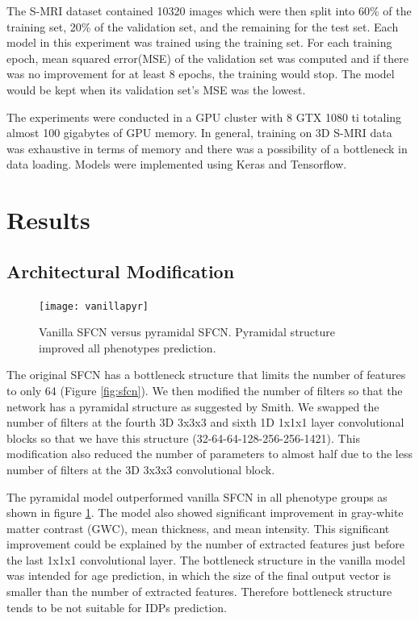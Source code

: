 \documentclass{article}
\begin{document}
    The S-MRI dataset contained 10320 images which were then split into 60\% of the training set, 20\% of the validation set, and the remaining for the test set. 
    Each model in this experiment was trained using the training set. 
    For each training epoch, mean squared error(MSE) of the validation set was computed and if there was no improvement for at least 8 epochs, the training would stop. 
    The model would be kept when its validation set’s MSE was the lowest.

    The experiments were conducted in a GPU cluster with 8 GTX 1080 ti totaling almost 100 gigabytes of GPU memory. 
    In general, training on 3D S-MRI data was exhaustive in terms of memory and there was a possibility of a bottleneck in data loading. 
    Models were implemented using Keras and Tensorflow.
    \section*{Results}
    
    \subsection*{Architectural Modification}
    \begin{figure}[h]
        \centering
        \texttt{[image: vanillapyr]}
        \centering
        \caption{
            Vanilla SFCN versus pyramidal SFCN. 
            Pyramidal structure improved all phenotypes prediction.}
        \label{fig:vanillapyr}
    \end{figure}
    The original SFCN has a bottleneck structure that limits the number of features to only 64 (Figure \ref{fig:sfcn}). 
    We then modified the number of filters so that the network has a pyramidal structure as suggested by Smith\cite*[]{smith}.  
    We swapped the number of filters at the fourth 3D 3x3x3 and sixth 1D 1x1x1 layer convolutional blocks so that we have this structure (32-64-64-128-256-256-1421). 
    This modification also reduced the number of parameters to almost half due to the less number of filters at the 3D 3x3x3 convolutional block.

    The pyramidal model outperformed vanilla SFCN in all phenotype groups as shown in figure \ref{fig:vanillapyr}. 
    The model also showed significant improvement in gray-white matter contrast (GWC), mean thickness, and mean intensity. 
    This significant improvement could be explained by the number of extracted features just before the last 1x1x1 convolutional layer. 
    The bottleneck structure in the vanilla model was intended for age prediction, in which the size of the final output vector is smaller than the number of extracted features. 
    Therefore bottleneck structure tends to be not suitable for IDPs prediction.
\end{document}
